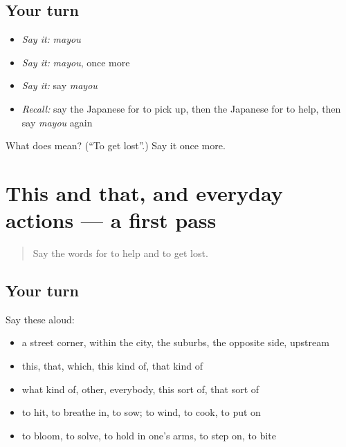 \subsection*{Your turn}
\begin{itemize}
\raggedright
  \item \emph{Say it:} \emph{mayou}
  \item \emph{Say it:} \emph{mayou}, once more
  \item \emph{Say it:} say \emph{mayou}
  \item \emph{Recall:} say the Japanese for to pick up, then the Japanese for to help, then say \emph{mayou} again
\end{itemize}

\begin{tcolorbox}[breakable,colback=teal!4,colframe=teal!35!black,title={Before you move on}]
What does  mean? (\textquotedblleft{}To get lost\textquotedblright{}.) Say it once more.
\end{tcolorbox}
\section[(dialogue)]{This and that, and everyday actions — a first pass}

\label{lesson:JA-R91-first-pass-this-and-that-and-everyday-actions}



\begin{quote}
Say the words for to help and to get lost.
\end{quote}

\subsection*{Your turn}
Say these aloud:

\begin{itemize}
\raggedright
  \item a street corner, within the city, the suburbs, the opposite side, upstream
  \item this, that, which, this kind of, that kind of
  \item what kind of, other, everybody, this sort of, that sort of
  \item to hit, to breathe in, to sow; to wind, to cook, to put on
  \item to bloom, to solve, to hold in one's arms, to step on, to bite
\end{itemize}

